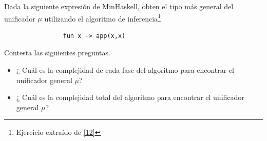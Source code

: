     \begin{exercise} Dada la siguiente expresión de MinHaskell, obten el tipo más general del unificador $\mu$ utilizando el algoritmo de inferencia\footnote{Ejercicio extraído de \hyperlink{12}{[12]}}
           \begin{lstlisting}
                fun x -> app(x,x)
           \end{lstlisting} 
    \end{exercise}

   \begin{exercise} Contesta las siguientes preguntas.\\
	\begin{itemize}
	    \item ¿ Cuál es la complejidad de cada fase del algoritmo para encontrar el unificador general $\mu$?\\
               \item ¿ Cuál es la complejidad total del algoritmo para encontrar el unificador general $\mu$?
	 \end{itemize}
   \end{exercise}
